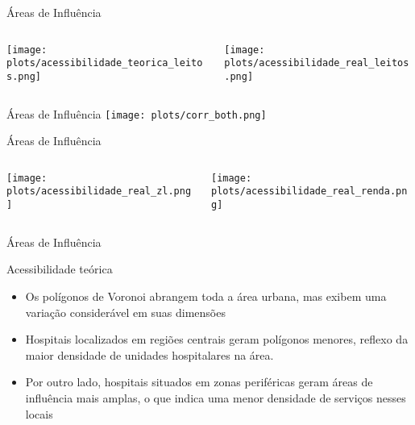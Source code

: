 \documentclass{beamer}
\begin{document}
\begin{frame}{Áreas de Influência}
    \begin{columns}
        \begin{column}{0.5\textwidth}
            \texttt{[image: plots/acessibilidade\_teorica\_leitos.png]} 
        \end{column}

        \begin{column}{0.5\textwidth}
            \texttt{[image: plots/acessibilidade\_real\_leitos.png]} 
        \end{column}
    \end{columns}
\end{frame}

\begin{frame}{Áreas de Influência}
    \texttt{[image: plots/corr\_both.png]} 
\end{frame}




\begin{frame}{Áreas de Influência}
    \begin{columns}
        \begin{column}{0.5\textwidth}
            \texttt{[image: plots/acessibilidade\_real\_zl.png]} 
        \end{column}

        \begin{column}{0.5\textwidth}
            \texttt{[image: plots/acessibilidade\_real\_renda.png]} 
        \end{column}
    \end{columns}
\end{frame}

\begin{frame}{Áreas de Influência}
    \begin{block}{Acessibilidade teórica}
      \begin{itemize}
        \item Os polígonos de Voronoi abrangem toda a área urbana, mas exibem uma variação considerável em suas dimensões
        \item Hospitais localizados em regiões centrais geram polígonos menores, reflexo da maior densidade de unidades hospitalares na área.
        \item Por outro lado, hospitais situados em zonas periféricas geram áreas de influência mais amplas, o que indica uma menor densidade de serviços nesses locais
      \end{itemize}
    \end{block}
\end{frame}
\end{document}
